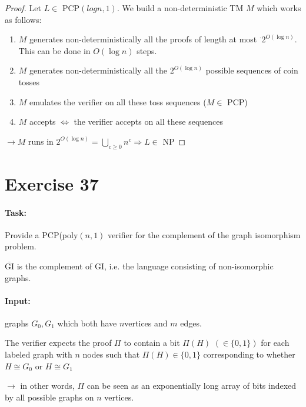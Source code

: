\documentclass[11pt]{article}
\theoremstyle{definition}
\theoremstyle{definition}
\begin{document}
\begin{proof}

Let $ L \in $ PCP$(log n, 1) $. We build a non-deterministic TM $ M $ which works as follows:
\begin{enumerate}
\item $ M $ generates non-deterministically all the proofs of length at most $ ^\cdot 2^{O(\log n)} $. This can be done in $ O(\log n) $ steps.
\item $ M $ generates non-deterministically all the $ 2^{O(\log n)} $ possible sequences of coin tosses
\item $ M $ emulates the verifier on all these toss sequences ($ M \in $ PCP)
\item $ M $ accepts $ \Leftrightarrow $ the verifier accepts on all these sequences
\end{enumerate}

$ \rightarrow M $ runs in $ 2^{O(\log n )} = \bigcup \limits_{c \geq 0} n^c \Rightarrow L \in $ NP

\end{proof}

\section*{Exercise 37}

\paragraph{Task:} Provide a PCP(poly$(n,1)$ verifier for the complement of the graph isomorphism problem.

$ \overline{\text{GI}} $ is the complement of GI, i.e. the language consisting of non-isomorphic graphs. \newline

\paragraph{Input:} graphs $ G_0, G_1 $ which both have $ n $vertices and $ m $ edges.

The verifier expects the proof $ \Pi $ to contain a bit $ \Pi(H) $ $(\in \{0, 1\}) $ for each labeled graph with $ n $ nodes such that $ \Pi(H) \in \{0, 1\} $ corresponding to whether $ H \cong G_0 $ or $ H \cong G_1 $ \newline

$ \rightarrow $ in other words, $ \Pi $ can be seen as an exponentially long array of bits indexed by all possible graphs on $ n $ vertices.
\end{document}
